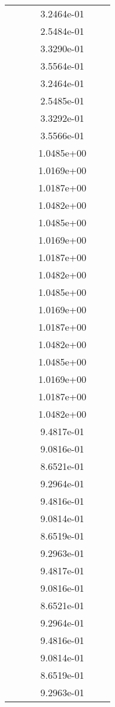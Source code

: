 \begin{xltabular}{\textwidth}{r|rS[table-format=1.3e+2]S[table-format=1.4e+2]S[table-format=1.4e+2]S[table-format=-1.5]}
&  &  & 3.2464e-01 & & \\
&  &  & 2.5484e-01 & & \\
&  &  & 3.3290e-01 & & \\
&  &  & 3.5564e-01 & & \\
&  &  & 3.2464e-01 & & \\
&  &  & 2.5485e-01 & & \\
&  &  & 3.3292e-01 & & \\
&  &  & 3.5566e-01 & & \\
&  &  & 1.0485e+00 & & \\
&  &  & 1.0169e+00 & & \\
&  &  & 1.0187e+00 & & \\
&  &  & 1.0482e+00 & & \\
&  &  & 1.0485e+00 & & \\
&  &  & 1.0169e+00 & & \\
&  &  & 1.0187e+00 & & \\
&  &  & 1.0482e+00 & & \\
&  &  & 1.0485e+00 & & \\
&  &  & 1.0169e+00 & & \\
&  &  & 1.0187e+00 & & \\
&  &  & 1.0482e+00 & & \\
&  &  & 1.0485e+00 & & \\
&  &  & 1.0169e+00 & & \\
&  &  & 1.0187e+00 & & \\
&  &  & 1.0482e+00 & & \\
&  &  & 9.4817e-01 & & \\
&  &  & 9.0816e-01 & & \\
&  &  & 8.6521e-01 & & \\
&  &  & 9.2964e-01 & & \\
&  &  & 9.4816e-01 & & \\
&  &  & 9.0814e-01 & & \\
&  &  & 8.6519e-01 & & \\
&  &  & 9.2963e-01 & & \\
&  &  & 9.4817e-01 & & \\
&  &  & 9.0816e-01 & & \\
&  &  & 8.6521e-01 & & \\
&  &  & 9.2964e-01 & & \\
&  &  & 9.4816e-01 & & \\
&  &  & 9.0814e-01 & & \\
&  &  & 8.6519e-01 & & \\
&  &  & 9.2963e-01 & & \\

\end{xltabular}
